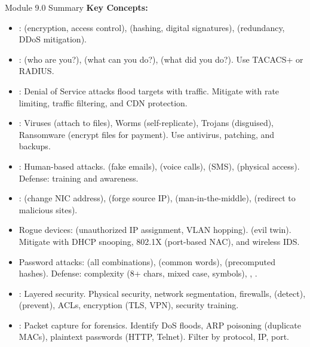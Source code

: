 \documentclass[aspectratio=169]{beamer}  %
\begin{document}
\begin{frame}[t,allowframebreaks]{Module 9.0 Summary}
    \small
    \textbf{Key Concepts:}
    \begin{itemize}
        \item {}:  (encryption, access control),  (hashing, digital signatures),  (redundancy, DDoS mitigation).
        \item {}:  (who are you?),  (what can you do?),  (what did you do?). Use TACACS+ or RADIUS.
        \item {}: Denial of Service attacks flood targets with traffic. Mitigate with rate limiting, traffic filtering, and CDN protection.
        \item {}: Viruses (attach to files), Worms (self-replicate), Trojans (disguised), Ransomware (encrypt files for payment). Use antivirus, patching, and backups.
        \item {}: Human-based attacks.  (fake emails),  (voice calls),  (SMS),  (physical access). Defense: training and awareness.
        \item {}:  (change NIC address),  (forge source IP),  (man-in-the-middle),  (redirect to malicious sites).
        \item Rogue devices:  (unauthorized IP assignment, VLAN hopping).  (evil twin). Mitigate with DHCP snooping, 802.1X (port-based NAC), and wireless IDS.
        \item Password attacks:  (all combinations),  (common words),  (precomputed hashes). Defense: complexity (8+ chars, mixed case, symbols), , .
        \item {}: Layered security. Physical security, network segmentation, firewalls,  (detect),  (prevent), ACLs, encryption (TLS, VPN), security training.
        \item {}: Packet capture for forensics. Identify DoS floods, ARP poisoning (duplicate MACs), plaintext passwords (HTTP, Telnet). Filter by protocol, IP, port.
    \end{itemize}

\end{frame}
\end{document}
